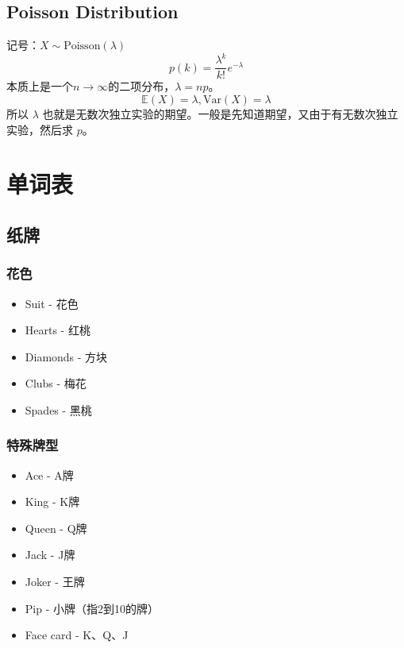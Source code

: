 \documentclass[9pt,landscape]{article}
\begin{document}
\begin{multicols}{3}
\subsection{Poisson Distribution}

记号：$X \sim \text{Poisson}(\lambda)$
\begin{equation*}
	p(k)=\frac{\lambda^k}{k!}e^{-\lambda}
\end{equation*}
本质上是一个$n\to\infty$的二项分布，$\lambda=np$。
\begin{equation*}
	\mathbb{E}(X)=\lambda,\text{Var}(X)=\lambda
\end{equation*}
所以 $\lambda$ 也就是无数次独立实验的期望。一般是先知道期望，又由于有无数次独立实验，然后求 $p$。

\section{单词表}

\subsection{纸牌}

\subsubsection{花色}

\begin{itemize}
	\item Suit - 花色
	\item Hearts - 红桃
	\item Diamonds - 方块
	\item Clubs - 梅花
	\item Spades - 黑桃
\end{itemize}

\subsubsection{特殊牌型}

\begin{itemize}
	\item Ace - A牌
	\item King - K牌
	\item Queen - Q牌
	\item Jack - J牌
	\item Joker - 王牌
	\item Pip - 小牌（指2到10的牌）
	\item Face card - K、Q、J
\end{itemize}


\end{multicols}
\end{document}

